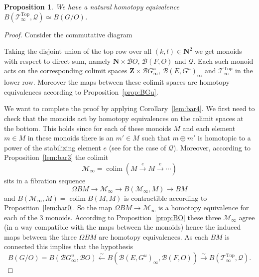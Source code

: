 \documentclass[reqno]{amsart}
\newcommand{\THOMAS}[1]%
	{\begin{quotation}{\footnotesize\textcolor{brown}{\textbf{Thomas:} #1}}\end{quotation}}
\theoremstyle{theorem}
\newtheorem{proposition}[corollary]{Proposition}
\theoremstyle{remark}
\theoremstyle{definition}
\DeclareMathOperator*{\colim}{colim}
\newcommand{\T}{\mathcal{T}}
\newcommand{\B}{\mathcal{B}}
\newcommand{\Z}{\mathbf{Z}}
\newcommand{\N}{\mathbf{N}}
\newcommand{\QQ}{\mathcal{Q}}
\newcommand{\TOP}{\mathrm{Top}}
\begin{document}
\begin{proposition}\label{prop:B(G/O)}
We have a natural homotopy equivalence $B(\T^\TOP_\infty,\QQ) \simeq B(G/O)$.
\end{proposition}
\begin{proof}
Consider the commutative diagram
\begin{center}
\end{center}
Taking the disjoint union of the top row over all $(k,l) \in \N^2$ we get monoids with respect to direct sum, namely $\N\times \B O$, $\B(F, O)$ and $\QQ$.
Each such monoid acts on the corresponding colimit spaces 
$\Z\times \B G^u_\infty$, $\B(E,G^u)_\infty$ and $\T_\infty^\TOP$ in the lower row. Moreover the maps between these colimit spaces
are homotopy equivalences according to Proposition~\ref{prop:BGu}.




We want to complete the proof by applying Corollary~\ref{lem:bar4}. We first need to check that the monoids
act by homotopy equivalences on the colimit spaces at the bottom. This holds since for 
each of these monoids $M$ and each element $m \in M$ in these monoids there is an $m'\in M$
such that $m\oplus m'$ is homotopic to a power of the stabilizing element $e$ (see \cite[Lemma 4.2]{ACGK}
for the case of $\QQ$). Moreover, according to Proposition~\ref{lem:bar3} the colimit 
\[\mathcal{M}_\infty=\colim(M\xrightarrow{e} M \xrightarrow{e}  \cdots)\]
sits in a fibration sequence
\[\Omega B M \to \mathcal{M}_\infty \to B(\mathcal{M}_\infty,M)\to BM\]
and $B(\mathcal{M}_\infty,M)=\colim B(M,M)$ is contractible according to Proposition~\ref{lem:bar0}.
So the map $\Omega B M\to \mathcal{M}_\infty$ is a homotopy equivalence for each of the 3 monoids. According to Proposition~\ref{prop:BO} these three $\mathcal{M}_\infty$ agree (in a way compatible with the maps between the monoids) hence the induced maps between the three $\Omega BM$ are homotopy equivalences. As each $BM$ is connected this implies that the hypothesis
\[B(G/O)=B(\B G^u_\infty, \B O) \xleftarrow{\sim} B(\B(E,G^u)_\infty,\B(F,O)) \xrightarrow{\sim} B(\T^\TOP_\infty,\QQ).\]
\end{proof}
\end{document}
